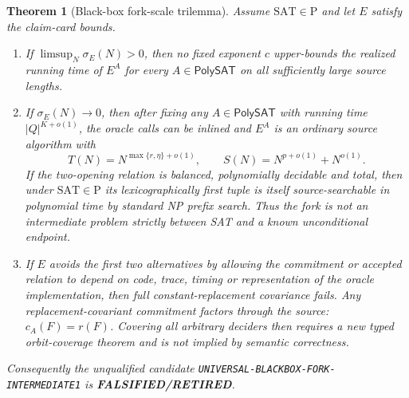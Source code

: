 \documentclass[11pt]{article}
\newtheorem{theorem}{Theorem}
\newcommand{\SAT}{\mathrm{SAT}}
\begin{document}
\begin{theorem}[Black-box fork-scale trilemma]
\label{thm:trilemma}
Assume $\SAT\in\mathrm P$ and let $E$ satisfy the claim-card bounds.
\begin{enumerate}
\item If $\limsup_N\sigma_E(N)>0$, then no fixed exponent $c$ upper-bounds
the realized running time of $E^A$ for every $A\in\mathsf{PolySAT}$ on all
sufficiently large source lengths.
\item If $\sigma_E(N)\to0$, then after fixing any
$A\in\mathsf{PolySAT}$ with running time $|Q|^{K+o(1)}$, the oracle calls can
be inlined and $E^A$ is an ordinary source algorithm with
\[
 T(N)=N^{\max\{r,\eta\}+o(1)},\qquad
 S(N)=N^{p+o(1)}+N^{o(1)}.
\]
If the two-opening relation is balanced, polynomially decidable and total,
then under $\SAT\in\mathrm P$ its lexicographically first tuple is itself
source-searchable in polynomial time by standard NP prefix search.  Thus the
fork is not an intermediate problem strictly between SAT and a known
unconditional endpoint.
\item If $E$ avoids the first two alternatives by allowing the commitment
or accepted relation to depend on code, trace, timing or representation of
the oracle implementation, then full constant-replacement covariance fails.
Any replacement-covariant commitment factors through the source:
$c_A(F)=r(F)$.  Covering all arbitrary deciders then requires a new typed
orbit-coverage theorem and is not implied by semantic correctness.
\end{enumerate}
Consequently the unqualified candidate
\texttt{UNIVERSAL-BLACKBOX-FORK-INTERMEDIATE1} is
\textbf{FALSIFIED/RETIRED}.
\end{theorem}
\end{document}
